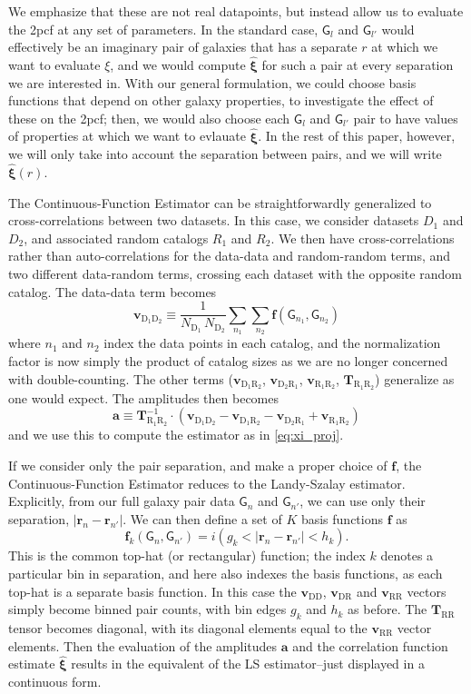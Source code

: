 \documentclass[modern]{aastex62}
\newcommand{\cf}{2pcf\xspace} %
\newcommand{\Est}{The Continuous-Function Estimator\xspace}
\newcommand{\est}{the Continuous-Function Estimator\xspace}
\newcommand{\LS}{LS\xspace}
\newcommand{\inv}{^{-1}}
\newcommand{\bld}[1]{\bm{#1}} %
\newcommand{\vv}[1]{\bld{v}_\mathrm{#1}}
\newcommand{\TT}[1]{\bld{T}_\mathrm{#1}}
\newcommand{\ff}{\bld{f}}
\newcommand{\NN}[1]{N_\mathrm{#1}}
\newcommand{\GG}[1]{\mathsf{G}_{#1}}
\begin{document}
We emphasize that these are not real datapoints, but instead allow us to evaluate the \cf at any set of parameters.
In the standard case, $\GG{l}$ and $\GG{l'}$ would effectively be an imaginary pair of galaxies that has a separate $r$ at which we want to evaluate $\xi$, and we would compute $\bld{\hat{\xi}}$ for such a pair at every separation we are interested in.
With our general formulation, we could choose basis functions that depend on other galaxy properties, to investigate the effect of these on the \cf; then, we would also choose each $\GG{l}$ and $\GG{l'}$ pair to have values of properties at which we want to evlauate $\bld{\hat{\xi}}$. 
In the rest of this paper, however, we will only take into account the separation between pairs, and we will write $\bld{\hat{\xi}}(r)$.

\Est can be straightforwardly generalized to cross-correlations between two datasets.
In this case, we consider datasets $D_1$ and $D_2$, and associated random catalogs $R_1$ and $R_2$. 
We then have cross-correlations rather than auto-correlations for the data-data and random-random terms, and two different data-random terms, crossing each dataset with the opposite random catalog. 
The data-data term becomes 
\begin{equation}
    \vv{D_1 D_2} \equiv \frac{1}{\NN{D_1}\,\NN{D_2}} \sum_{n_1} \sum_{n_2} \ff(\GG{n_1}, \GG{n_2})
\end{equation}
where $n_1$ and $n_2$ index the data points in each catalog, and the normalization factor is now simply the product of catalog sizes as we are no longer concerned with double-counting.
The other terms ($\vv{D_1 R_2}$, $\vv{D_2 R_1}$, $\vv{R_1 R_2}$, $\TT{R_1 R_2}$) generalize as one would expect.
The amplitudes then becomes
\begin{equation}\displaystyle
    \bld{a} \equiv \TT{R_1 R_2}\inv \cdot (\vv{D_1 D_2} - \vv{D_1 R_2} - \vv{D_2 R_1} + \vv{R_1 R_2})
 \end{equation}
and we use this to compute the estimator as in \ref{eq:xi_proj}.

If we consider only the pair separation, and make a proper choice of $\ff$, \est reduces to the Landy-Szalay estimator.
Explicitly, from our full galaxy pair data $\GG{n}$ and $\GG{n'}$, we can use only their separation,  $|\bld{r}_n - \bld{r}_{n'}|$.
We can then define a set of $K$ basis functions $\ff$ as
\begin{equation}
\ff_k(\GG{n}, \GG{n'}) =  i(g_k < |\bld{r}_n - \bld{r}_{n'}| < h_k).
\end{equation}
This is the common top-hat (or rectangular) function; the index $k$ denotes a particular bin in separation, and here also indexes the basis functions, as each top-hat is a separate basis function.
In this case the $\vv{DD}$, $\vv{DR}$ and $\vv{RR}$ vectors simply become binned pair counts, with bin edges $g_k$ and $h_k$ as before.
The $\TT{RR}$ tensor becomes diagonal, with its diagonal elements equal to the $\vv{RR}$ vector elements.
Then the evaluation of the amplitudes $\bld{a}$ and the correlation function estimate $\bld{\hat{\xi}}$ results in the equivalent of the \LS estimator--just displayed in a continuous form.
\end{document}
